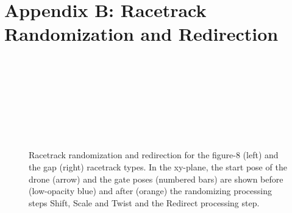 \section*{Appendix B: Racetrack Randomization and Redirection}
\begin{figure}[H]
    \newcommand{\dimmm}{0.47\textwidth}
    \newcommand{\dimmmb}{0.05\textwidth}
    \newcommand{\vertspace}{-2ex}
    \centering
    \\[\vertspace]
        \subfloat{\begin{minipage}[c]{\dimmmb}$\ $\end{minipage}}
    \\[\vertspace]
    \\[\vertspace]
        \subfloat{\begin{minipage}[c]{\dimmmb}$\ $\end{minipage}}
    \\[\vertspace]
    \\[\vertspace]
        \subfloat{\begin{minipage}[c]{\dimmmb}$\ $\end{minipage}}
    \\[\vertspace]
    \\[\vertspace]
    \subfloat{\begin{minipage}[c]{\dimmmb}$\ $\end{minipage}}
    \caption[
        Racetrack randomization and redirection
    ]{
        Racetrack randomization and redirection for
        the figure-8 (left) 
        and the gap (right) racetrack types.
        In the xy-plane, the start pose of the drone (arrow) and the gate poses 
        (numbered bars)
        are shown before (low-opacity blue) and after (orange) 
        the randomizing processing steps Shift, Scale and Twist
        and the Redirect processing step.
        \label{fig:racetrack_comp}
    }
\end{figure}
